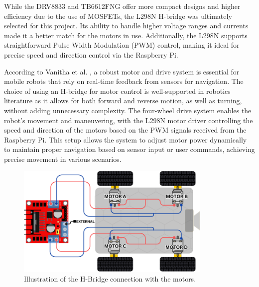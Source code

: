 While the DRV8833 and TB6612FNG offer more compact designs and higher efficiency due to the use of MOSFETs, the L298N H-bridge was ultimately selected for this project. Its ability to handle higher voltage ranges and currents made it a better match for the motors in use. Additionally, the L298N supports straightforward Pulse Width Modulation (PWM) control, making it ideal for precise speed and direction control via the Raspberry Pi.


According to Vanitha et al. \cite{vanitha2016}, a robust motor and drive system is essential for mobile robots that rely on real-time feedback from sensors for navigation. The choice of using an H-bridge for motor control is well-supported in robotics literature as it allows for both forward and reverse motion, as well as turning, without adding unnecessary complexity. The four-wheel drive system enables the robot's movement and maneuvering, with the L298N motor driver controlling the speed and direction of the motors based on the PWM signals received from the Raspberry Pi. This setup allows the system to adjust motor power dynamically to maintain proper navigation based on sensor input or user commands, achieving precise movement in various scenarios.

\begin{figure}[H]
	\centering

		\centering
		\includegraphics[width=0.835\textwidth]{ch4/figs/H-Bridge-Interface.png}
		\caption{Illustration of the H-Bridge connection with the motors.}
		\label{fig:motor_H-bridge_connection}
	\end{figure}


